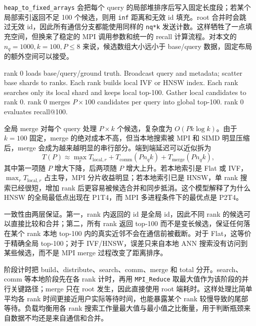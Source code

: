 \documentclass[11pt,a4paper]{article}
\begin{document}
\texttt{heap\_to\_fixed\_arrays} 会把每个 query 的局部堆排序后写入固定长度段；若某个局部索引返回不足 100 个候选，则用 \texttt{inf} 距离和无效 id 填充。root 合并时会跳过无效 id，因此所有通信分支都能使用同样的 \texttt{nq*k} 发送计数。这样牺牲了一点填充空间，但换来了稳定的 MPI 调用参数和统一的 recall 计算流程。对本文的 $n_q=1000,k=100,P\le8$ 来说，候选数组大小远小于 base/query 数据，固定布局的额外空间可以接受。

\begin{algorithm}[H]
\caption{MPI base-sharding ANN 查询流程}
\small
\begin{algorithmic}[1]
\State rank 0 loads base/query/ground truth.
\State Broadcast query and metadata; scatter base shards to ranks.
\State Each rank builds local IVF or HNSW index.
  \State Each rank searches only its local shard and keeps local top-100.
\EndFor
\State Gather local candidates to rank 0.
\State rank 0 merges $P\times 100$ candidates per query into global top-100.
\State rank 0 evaluates recall@100.
\end{algorithmic}
\end{algorithm}

全局 merge 对每个 query 处理 $P\times k$ 个候选，复杂度为 $O(Pk\log k)$。由于 $k=100$ 固定，merge 的绝对成本不高，但当本地搜索被 MPI 和 SIMD 明显压缩后，merge 会成为越来越明显的串行部分。端到端延迟可以近似拆为
\[
T(P)\approx \max_r T_{\mathrm{local},r}+T_{\mathrm{comm}}(Pn_qk)+T_{\mathrm{merge}}(Pn_qk),
\]
其中第一项随 $P$ 增大下降，后两项随 $P$ 增大上升。若本地索引是 Flat 或 IVF，$\max_rT_{\mathrm{local},r}$ 占主导，MPI 分片收益明显；若本地索引已是 HNSW，单 rank 搜索已经很短，增加 rank 后更容易被候选合并和同步抵消。这个模型解释了为什么 HNSW 的全局最低点出现在 P1T4，而 MPI 多进程条件下的最优点是 P2T4。

一致性由两层保证。第一，rank 内返回的 id 是全局 id，因此不同 rank 的候选可以直接比较和合并；第二，所有 rank 返回 top-100 而不是变长候选，保证任何落在某个 rank 本地 top-100 内的真实近邻不会在通信前被截断。对于 Flat，这等价于精确全局 top-100；对于 IVF/HNSW，误差只来自本地 ANN 搜索没有访问到某些候选，而不是 MPI merge 过程改变了距离排序。

阶段计时把 build、distribute、search、comm、merge 和 total 分开。search、comm 等本地阶段先在各 rank 计时，再用 \texttt{MPI\_Reduce} 取最大值作为该阶段的并行关键路径；merge 只在 root 发生，因此直接使用 root 端耗时。这样处理比简单平均各 rank 时间更接近用户实际等待时间，也能暴露某个 rank 较慢导致的尾部等待。负载均衡用各 rank 搜索工作量最大值与最小值之比衡量，用于判断瓶颈来自数据不均还是来自通信和合并。
\end{document}
